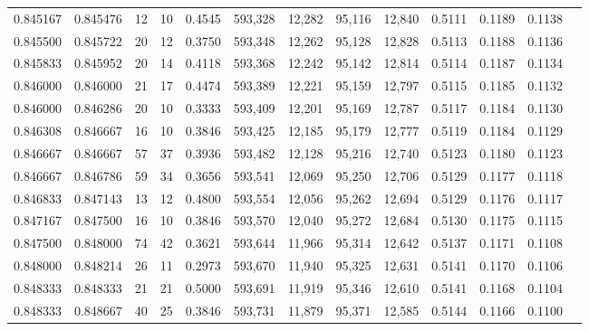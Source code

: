 \begin{tabular}{rrrrrrrrrrrrr}
0.845167 & 0.845476 &    12 &  10 &                                     0.4545 & 593,328 &  12,282 &  95,116 &  12,840 & 0.5111 & 0.1189 & 0.1138 \\
0.845500 & 0.845722 &    20 &  12 &                                     0.3750 & 593,348 &  12,262 &  95,128 &  12,828 & 0.5113 & 0.1188 & 0.1136 \\
0.845833 & 0.845952 &    20 &  14 &                                     0.4118 & 593,368 &  12,242 &  95,142 &  12,814 & 0.5114 & 0.1187 & 0.1134 \\
0.846000 & 0.846000 &    21 &  17 &                                     0.4474 & 593,389 &  12,221 &  95,159 &  12,797 & 0.5115 & 0.1185 & 0.1132 \\
0.846000 & 0.846286 &    20 &  10 &                                     0.3333 & 593,409 &  12,201 &  95,169 &  12,787 & 0.5117 & 0.1184 & 0.1130 \\
0.846308 & 0.846667 &    16 &  10 &                                     0.3846 & 593,425 &  12,185 &  95,179 &  12,777 & 0.5119 & 0.1184 & 0.1129 \\
0.846667 & 0.846667 &    57 &  37 &                                     0.3936 & 593,482 &  12,128 &  95,216 &  12,740 & 0.5123 & 0.1180 & 0.1123 \\
0.846667 & 0.846786 &    59 &  34 &                                     0.3656 & 593,541 &  12,069 &  95,250 &  12,706 & 0.5129 & 0.1177 & 0.1118 \\
0.846833 & 0.847143 &    13 &  12 &                                     0.4800 & 593,554 &  12,056 &  95,262 &  12,694 & 0.5129 & 0.1176 & 0.1117 \\
0.847167 & 0.847500 &    16 &  10 &                                     0.3846 & 593,570 &  12,040 &  95,272 &  12,684 & 0.5130 & 0.1175 & 0.1115 \\
0.847500 & 0.848000 &    74 &  42 &                                     0.3621 & 593,644 &  11,966 &  95,314 &  12,642 & 0.5137 & 0.1171 & 0.1108 \\
0.848000 & 0.848214 &    26 &  11 &                                     0.2973 & 593,670 &  11,940 &  95,325 &  12,631 & 0.5141 & 0.1170 & 0.1106 \\
0.848333 & 0.848333 &    21 &  21 &                                     0.5000 & 593,691 &  11,919 &  95,346 &  12,610 & 0.5141 & 0.1168 & 0.1104 \\
0.848333 & 0.848667 &    40 &  25 &                                     0.3846 & 593,731 &  11,879 &  95,371 &  12,585 & 0.5144 & 0.1166 & 0.1100 \\

\end{tabular}
